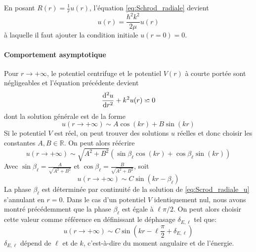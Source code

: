 En posant $R(r) = \frac{1}{r} u(r)$, l'équation \ref{eq:Schrod_radiale} devient
\begin{equation}
[- \frac{\hbar^2}{2\mu} \frac{\rmd^2}{\rmd r^2} + \frac{\ell(\ell+1)}{2 \mu r^2} + V(r)] u(r)  = \frac{\hbar^2 k^2}{2\mu} u(r)
\label{eq:Scrod_radiale_u}
\end{equation}
à laquelle il faut ajouter la condition initiale $u(r=0) = 0$. 

\paragraph*{Comportement asymptotique} Pour $r \rightarrow + \infty$, le potentiel centrifuge et le potentiel $V(r)$ à courte portée sont négligeables et l'équation précédente devient
\begin{equation}
\frac{\mathrm{d}^2 u}{\mathrm{d} r^2} + k^2 u(r) \backsimeq 0
\end{equation}
dont la solution générale est de la forme
\[ u(r \rightarrow + \infty) \sim A \cos(kr) + B \sin(kr) \]
Si le potentiel $V$ est réel, on peut trouver des solutions $u$ réelles et donc choisir les constantes $A, B \in \mathbb{R}$. On peut alors réécrire 
\begin{equation}
u(r \rightarrow + \infty) \sim \sqrt{A^2+B^2} (\sin \beta_\ell \cos(kr) + \cos \beta_\ell \sin(kr) )
\end{equation}
Avec $\sin \beta_\ell = \frac{A}{\sqrt{A^2+B^2}}$ et $\cos \beta_\ell = \frac{B}{\sqrt{A^2+B^2}}$, soit
\begin{equation}
u(r \rightarrow + \infty) \sim C \sin(kr - \beta_\ell)
\end{equation}
La phase $\beta_\ell$ est déterminée par continuité de la solution de \ref{eq:Scrod_radiale_u} s'annulant en $r=0$. Dans le cas d'un potentiel $V$ identiquement nul, nous avons montré précédemment que la phase $\beta_\ell$ est égale à $\ell \pi/2$. On peut alors choisir cette valeur comme référence en définissant le déphasage $\delta_{E,\ell}$ tel que:
\[ u(r \rightarrow + \infty) \sim C \sin(kr -\ell \frac{\pi}{2} + \delta_{E,\ell}) \]
$\delta_{E,\ell}$ dépend de $\ell$ et de $k$, c'est-à-dire du moment angulaire et de l'énergie.

